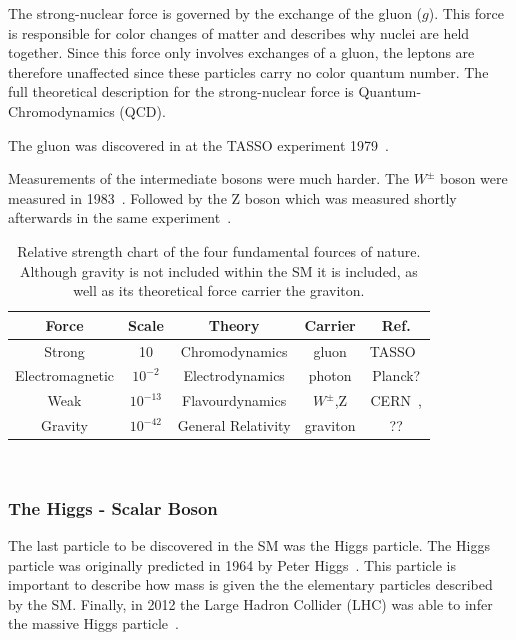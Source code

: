 The strong-nuclear force is governed by the exchange of the gluon ($g$).
This force is responsible for color changes of matter and describes why nuclei are held together.
Since this force only involves exchanges of a gluon, the leptons are therefore unaffected since these particles carry no color quantum number.
The full theoretical description for the strong-nuclear force is Quantum-Chromodynamics (QCD).

The gluon was discovered in at the TASSO experiment 1979~\citep{tasso_1978_BRANDELIK1979243, PETRA_PhysRevLett.43.830}.

Measurements of the intermediate bosons were much harder.
The $W^{\pm}$ boson were measured in 1983~\citep{wboson_measure_ARNISON1983103}.
Followed by the Z boson which was measured shortly afterwards in the same experiment~\citep{zboson_measure_1983398}.

\begin{table}
\begin{center}
\begin{tabular}{||c c c c c||}
 \hline
 Force & Scale & Theory & Carrier & Ref. \\ [0.5ex]
 \hline\hline
 Strong & 10 & Chromodynamics & gluon & TASSO~\citep{tasso_1978_BRANDELIK1979243} \\
 \hline
 Electromagnetic & $10^{-2} $ & Electrodynamics & photon & Planck? \\
 \hline
 Weak & $10^{-13}$ & Flavourdynamics & $W^{\pm}$,Z & CERN~\citep{wboson_measure_ARNISON1983103},\citep{zboson_measure_1983398}\\
 \hline
 Gravity & $10^{-42}$ & General Relativity & graviton  & ?? \\
 \hline
 \hline
\end{tabular}
\caption{Relative strength chart of the four fundamental fources of nature. Although gravity is not included within the SM it is included, as well as its theoretical force carrier the graviton.}
\end{center}
\end{table}
~\label{table:forces}

\subsubsection{The Higgs - Scalar Boson}

The last particle to be discovered in the SM was the Higgs particle.
The Higgs particle was originally predicted in 1964 by Peter Higgs~\citep{HIGGS1964132}.
This particle is important to describe how mass is given the the elementary particles described by the SM.
Finally, in 2012 the Large Hadron Collider (LHC) was able to infer the massive Higgs particle~\citep{higgs_discovery_20121}.

